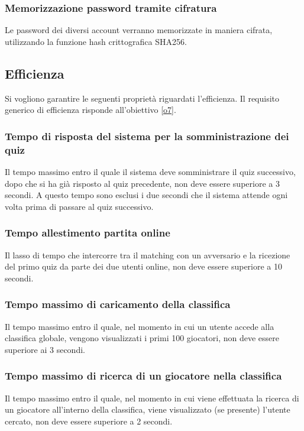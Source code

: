 \subsubsection{Memorizzazione password tramite cifratura}
Le password dei diversi account verranno memorizzate in maniera cifrata, utilizzando la funzione hash crittografica SHA256.

\subsection{Efficienza}
Si vogliono garantire le seguenti proprietà riguardati l'efficienza. Il requisito generico di efficienza risponde all'obiettivo \ref{o7}.

\subsubsection{Tempo di risposta del sistema per la somministrazione dei quiz}
Il tempo massimo entro il quale il sistema deve somministrare il quiz successivo, dopo che si ha già risposto al quiz precedente, non deve essere superiore a 3 secondi. A questo tempo sono esclusi i due secondi che il sistema attende ogni volta prima di passare al quiz successivo.

\subsubsection{Tempo allestimento partita online}
Il lasso di tempo che intercorre tra il matching con un avversario e la ricezione del primo quiz da parte dei due utenti online, non deve essere superiore a 10 secondi.

\subsubsection{Tempo massimo di caricamento della classifica}
Il tempo massimo entro il quale, nel momento in cui un utente accede alla classifica globale, vengono visualizzati i primi 100 giocatori, non deve essere superiore ai 3 secondi. 

\subsubsection{Tempo massimo di ricerca di un giocatore nella classifica}
Il tempo massimo entro il quale, nel momento in cui viene effettuata la ricerca di un giocatore all'interno della classifica, viene visualizzato (se presente) l'utente cercato, non deve essere superiore a 2 secondi.

